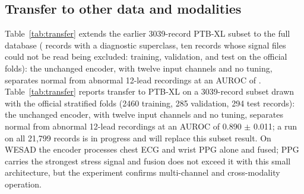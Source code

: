 \documentclass[journal]{IEEEtran}
\begin{document}
\subsection{Transfer to other data and modalities}
\begin{table}[!t]
\centering
\caption{Transfer beyond MIT-BIH with the unchanged architecture (five seeds\ifhaveptbxl; PTB-XL: \ptbxlNrec{} records on the official folds\fi).}
\label{tab:transfer}
\footnotesize
{}
\end{table}
\ifhaveptbxl Table~\ref{tab:transfer} extends the earlier 3039-record PTB-XL subset to the full database (\ptbxlNrec{} records with a diagnostic superclass, ten records whose signal files could not be read being excluded: \ptbxlNtrain{} training, \ptbxlNval{} validation, and \ptbxlNtest{} test on the official folds): the unchanged encoder, with twelve input channels and no tuning, separates normal from abnormal 12-lead recordings at an AUROC of \ptbxlAUROC{}. \else Table~\ref{tab:transfer} reports transfer to PTB-XL on a 3039-record subset drawn with the official stratified folds (2460 training, 285 validation, 294 test records): the unchanged encoder, with twelve input channels and no tuning, separates normal from abnormal 12-lead recordings at an AUROC of 0.890 $\pm$ 0.011; a run on all 21,799 records is in progress and will replace this subset result. \fi On WESAD the encoder processes chest ECG and wrist PPG alone and fused; PPG carries the strongest stress signal and fusion does not exceed it with this small architecture, but the experiment confirms multi-channel and cross-modality operation.
\end{document}
